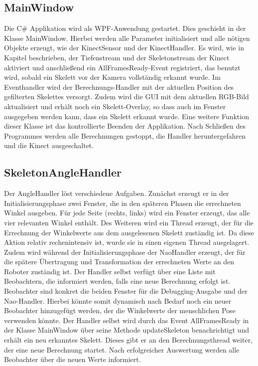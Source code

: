 \subsection{MainWindow}
Die C\# Applikation wird als WPF-Anwendung gestartet. Dies geschieht in der Klasse \textsf{MainWindow}. Hierbei werden alle Parameter initialisiert und alle nötigen Objekte erzeugt, wie der KinectSensor und der KinectHandler. Es wird, wie in Kapitel  beschrieben, der Tiefenstream und der Skeletonstream der Kinect aktiviert und anschließend ein AllFramesReady-Event registriert, das benutzt wird, sobald ein Skelett vor der Kamera vollständig erkannt wurde. Im Eventhandler wird der Berechnungs-Handler mit der aktuellen Position des gefilterten Skelettes versorgt. Zudem wird die GUI mit dem aktuellen RGB-Bild aktualisiert und erhält noch ein Skelett-Overlay, so dass auch im Fenster ausgegeben werden kann, dass ein Skelett erkannt wurde. Eine weitere Funktion dieser Klasse ist das kontrollierte Beenden der Applikation. Nach Schließen des Programmes werden alle Berechnungen gestoppt, die Handler heruntergefahren und die Kinect ausgeschaltet.



\subsection{SkeletonAngleHandler}
Der \textsf{AngleHandler} löst verschiedene Aufgaben. Zunächst erzeugt er in der Initialisierungsphase zwei Fenster, die in den späteren Phasen die errechneten Winkel ausgeben. Für jede Seite (rechts, links) wird ein Fenster erzeugt, das alle vier relevanten Winkel enthält. Des Weiteren wird ein Thread erzeugt, der für die Errechnung der Winkelwerte aus dem ausgelesenen Skelett zuständig ist. Da diese Aktion relativ rechenintensiv ist, wurde sie in einen eigenen Thread ausgelagert. Zudem wird während der Initialisierungsphase der \textsf{NaoHandler} erzeugt, der für die spätere Übertragung und Transformation der errechneten Werte an den Roboter zuständig ist.
Der Handler selbst verfügt über eine Liste mit Beobachtern, die informiert werden, falls eine neue Berechnung erfolgt ist. Beobachter sind konkret die beiden Fenster für die Debugging-Ausgabe und der Nao-Handler. Hierbei könnte somit dynamisch nach Bedarf noch ein neuer Beobachter hinzugefügt werden, der die Winkelwerte der menschlichen Pose verwenden könnte.
Der Handler selbst wird durch das Event \textsf{AllFramesReady} in der Klasse MainWindow über seine Methode \textsf{updateSkeleton} benachrichtigt und erhält ein neu erkanntes Skelett. Dieses gibt er an den Berechnungsthread weiter, der eine neue Berechnung startet. Nach erfolgreicher Auswertung werden alle Beobachter über die neuen Werte informiert. 

